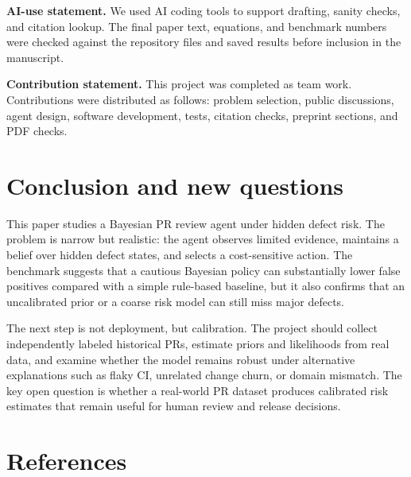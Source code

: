 \documentclass{article}
\begin{document}
\textbf{AI-use statement.} We used AI coding tools to support drafting, sanity checks, and citation lookup. The final paper text, equations, and benchmark numbers were checked against the repository files and saved results before inclusion in the manuscript.

\textbf{Contribution statement.} This project was completed as team work. Contributions were distributed as follows: problem selection, public discussions, agent design, software development, tests, citation checks, preprint sections, and PDF checks.

\section{Conclusion and new questions}

This paper studies a Bayesian PR review agent under hidden defect risk. The problem is narrow but realistic: the agent observes limited evidence, maintains a belief over hidden defect states, and selects a cost-sensitive action. The benchmark suggests that a cautious Bayesian policy can substantially lower false positives compared with a simple rule-based baseline, but it also confirms that an uncalibrated prior or a coarse risk model can still miss major defects.

The next step is not deployment, but calibration. The project should collect independently labeled historical PRs, estimate priors and likelihoods from real data, and examine whether the model remains robust under alternative explanations such as flaky CI, unrelated change churn, or domain mismatch. The key open question is whether a real-world PR dataset produces calibrated risk estimates that remain useful for human review and release decisions.

\section{References}


\end{document}
